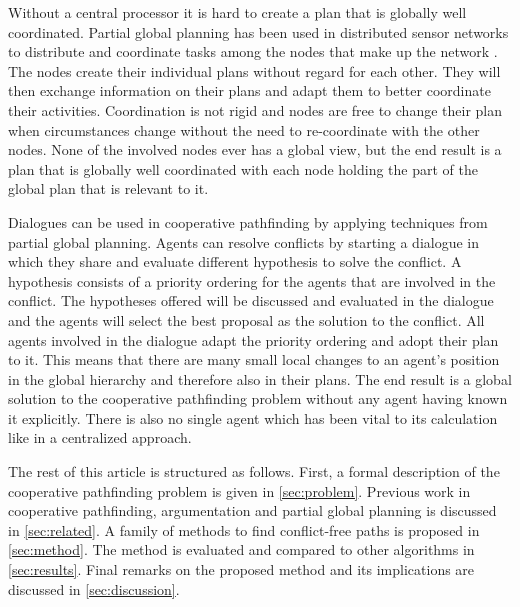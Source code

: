 Without a central processor it is hard to create a plan that is globally well
coordinated. Partial global planning has been used in distributed sensor
networks to distribute and coordinate tasks among the nodes that make up the
network \citep{durfee1991}. The nodes create their individual plans without
regard for each other. They will then exchange information on their plans and
adapt them to better coordinate their activities. Coordination is not rigid and
nodes are free to change their plan when circumstances change
without the need to re-coordinate with the other nodes. None of the involved
nodes ever has a global view, but the end result is a plan that is globally well
coordinated with each node holding the part of the global plan that is relevant
to it.

Dialogues can be used in cooperative pathfinding by applying techniques from
partial global planning. Agents can resolve conflicts by starting a dialogue in
which they share and evaluate different hypothesis to solve the conflict. A
hypothesis consists of a priority ordering for the agents that are involved in
the conflict. The hypotheses offered will be discussed and evaluated in the
dialogue and the agents will select the best proposal as the solution
to the conflict. All agents involved in the dialogue adapt the priority
ordering and adopt their plan to it. This means that there are many small local
changes to an agent's position in the global hierarchy and therefore also in
their plans. The end result is a global solution to the cooperative pathfinding
problem without any agent having known it explicitly. There is also no single
agent which has been vital to its calculation like in a centralized approach.

The rest of this article is structured as follows. First, a formal description
of the cooperative pathfinding problem is given in \autoref{sec:problem}.
Previous work in cooperative pathfinding, argumentation and partial global
planning is discussed in \autoref{sec:related}. A family of methods to find
conflict-free paths is proposed in \autoref{sec:method}. The method is
evaluated and compared to other algorithms in \autoref{sec:results}. Final
remarks on the proposed method and its implications are discussed in
\autoref{sec:discussion}.
